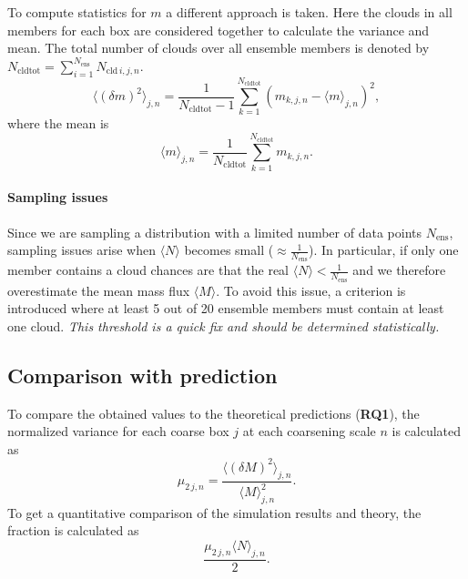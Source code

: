 \documentclass[a4paper, 12pt]{article}
\begin{document}
To compute statistics for $m$ a different approach is taken. Here the clouds in all members for each box are considered together to calculate the variance and mean. The total number of clouds over all ensemble members is denoted by $N_{\mathrm{cldtot}} = \sum_{i=1}^{N_{\mathrm{ens}}} N_{\mathrm{cld}\,i,j,n}$.
\begin{equation} \label{eq:calc_varm}
 \langle (\delta m )^2 \rangle_{j,n} = \frac{1}{N_{\mathrm{cldtot}}-1} \sum_{k=1}^{N_{\mathrm{cldtot}}} (m_{k,j,n} - \langle m \rangle_{j,n})^2,
\end{equation}
where the mean is
\begin{equation} \label{eq:calc_meanm}
 \langle m \rangle_{j,n} = \frac{1}{N_{\mathrm{cldtot}}} \sum_{k=1}^{N_{\mathrm{cldtot}}} m_{k,j,n}.
\end{equation}


\paragraph{Sampling issues}
Since we are sampling a distribution with a limited number of data points $N_{\mathrm{ens}}$, sampling issues arise when $\langle N \rangle$ becomes small ($\approx \frac{1}{N_{\mathrm{ens}}}$). In particular, if only one member contains a cloud chances are that the real $\langle N \rangle < \frac{1}{N_{\mathrm{ens}}}$ and we therefore overestimate the mean mass flux $\langle M \rangle$. To avoid this issue, a criterion is introduced where at least 5 out of 20 ensemble members must contain at least one cloud. \textit{This threshold is a quick fix and should be determined statistically.}

\subsection{Comparison with prediction}
To compare the obtained values to the theoretical predictions (\textbf{RQ1}), the normalized variance for each coarse box $j$ at each coarsening scale $n$ is calculated as 
\begin{equation} \label{eq:normalized_variance}
 \mu_{2\,j, n} = \frac{\langle (\delta M )^2 \rangle_{j,n}}{\langle M \rangle_{j,n}^2}.
\end{equation}
To get a quantitative comparison of the simulation results and theory, the fraction is calculated as
\begin{equation} \label{eq:normalized_variance_fraction}
 \frac{\mu_{2\,j, n} \langle N \rangle_{j,n} }{2}.
\end{equation}
\end{document}
